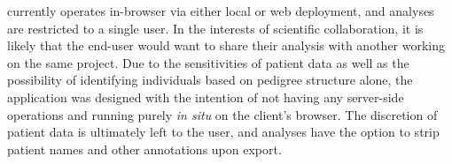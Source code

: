 \app currently operates in-browser via either local or web deployment, and analyses are restricted to a single user. In the interests of scientific collaboration, it is likely that the end-user would want to share their analysis with another working on the same project. Due to the sensitivities of patient data as well as the possibility of identifying individuals based on pedigree structure alone, the application was designed with the intention of not having any server-side operations and running purely \textit{in situ} on the client's browser. The discretion of patient data is ultimately left to the user, and analyses have the option to strip patient names and other annotations upon export.
